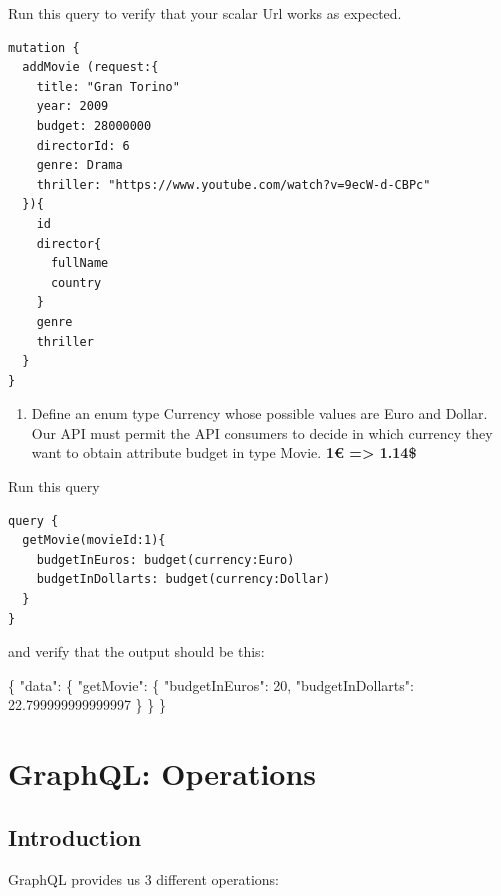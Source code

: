 \documentclass[]{book}
\newcommand{\euro}{€}
\newenvironment{Shaded}{\begin{snugshade}}{\end{snugshade}}
\newcommand{\DataTypeTok}[1]{\textcolor[rgb]{0.13,0.29,0.53}{#1}}
\newcommand{\DecValTok}[1]{\textcolor[rgb]{0.00,0.00,0.81}{#1}}
\newcommand{\FloatTok}[1]{\textcolor[rgb]{0.00,0.00,0.81}{#1}}
\newcommand{\FunctionTok}[1]{\textcolor[rgb]{0.00,0.00,0.00}{#1}}
\providecommand{\tightlist}{%
  \setlength{\itemsep}{0pt}\setlength{\parskip}{0pt}}
\begin{document}
Run this query to verify that your scalar Url works as expected.

\begin{verbatim}
mutation {
  addMovie (request:{
    title: "Gran Torino"
    year: 2009
    budget: 28000000
    directorId: 6
    genre: Drama
    thriller: "https://www.youtube.com/watch?v=9ecW-d-CBPc"
  }){
    id
    director{
      fullName
      country
    }
    genre
    thriller
  }
}
\end{verbatim}

\begin{enumerate}
\def\labelenumi{\arabic{enumi}.}
\setcounter{enumi}{3}
\tightlist
\item
  Define an enum type Currency whose possible values are Euro and
  Dollar. Our API must permit the API consumers to decide in which
  currency they want to obtain attribute budget in type Movie.
  \textbf{1\euro{} =\textgreater{} 1.14\$}
\end{enumerate}

Run this query

\begin{verbatim}
query {
  getMovie(movieId:1){
    budgetInEuros: budget(currency:Euro)
    budgetInDollarts: budget(currency:Dollar)
  }
}
\end{verbatim}

and verify that the output should be this:

\begin{Shaded}
\begin{Highlighting}[]
\FunctionTok{\{}
  \DataTypeTok{"data"}\FunctionTok{:} \FunctionTok{\{}
    \DataTypeTok{"getMovie"}\FunctionTok{:} \FunctionTok{\{}
      \DataTypeTok{"budgetInEuros"}\FunctionTok{:} \DecValTok{20}\FunctionTok{,}
      \DataTypeTok{"budgetInDollarts"}\FunctionTok{:} \FloatTok{22.799999999999997}
    \FunctionTok{\}}
  \FunctionTok{\}}
\FunctionTok{\}}
\end{Highlighting}
\end{Shaded}

\chapter{GraphQL: Operations}\label{graphql-operations}

\section{Introduction}\label{introduction-2}

GraphQL provides us 3 different operations:
\end{document}
